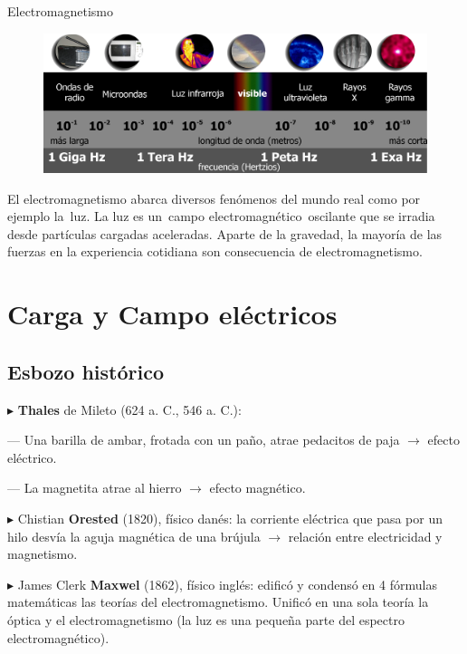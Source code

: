 \begin{myalertblock}{Electromagnetismo}
\begin{figure}[H]
		\centering
		\includegraphics[width=1\textwidth]{imagenes/imagenes22/T22IM01.png}
	\end{figure}

El electromagnetismo abarca diversos fenómenos del mundo real como por ejemplo la luz. La luz es un campo electromagnético oscilante que se irradia desde partículas cargadas aceleradas. Aparte de la gravedad, la mayoría de las fuerzas en la experiencia cotidiana son consecuencia de electromagnetismo.
\end{myalertblock}


\chapter{Carga y Campo eléctricos}

\vspace{-4mm} %
\section{Esbozo histórico}

\vspace{-4mm} %
$\blacktriangleright$ \textbf{Thales} de Mileto (624 a. C., 546 a. C.): 

--- Una barilla de ambar, frotada con un paño, atrae pedacitos de paja $\to$ efecto eléctrico.

--- La magnetita atrae al hierro $\to$ efecto magnético.

$\blacktriangleright$ Chistian  \textbf{Orested} (1820), físico danés: la corriente eléctrica que pasa por un hilo desvía la aguja magnética de una brújula $\to$ relación entre electricidad y magnetismo.

$\blacktriangleright$ James Clerk  \textbf{Maxwel} (1862), físico inglés: edificó y condensó en 4 fórmulas matemáticas las teorías del electromagnetismo. Unificó en una sola teoría la óptica y el electromagnetismo (la luz es una pequeña parte del espectro electromagnético).

